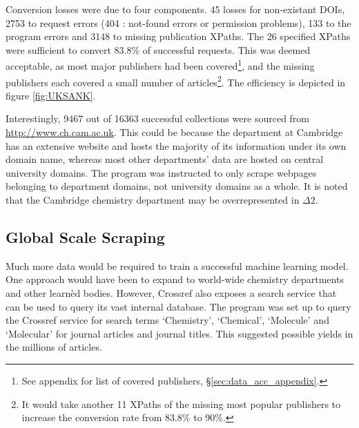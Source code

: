 Conversion losses were due to four components. 45 losses for non-existant DOIs, 2753 to request errors (404 : not-found errors or permission problems), 133 to the program errors and 3148 to missing publication XPaths. The 26 specified XPaths were sufficient to convert 83.8\% of successful requests. This was deemed acceptable, as most major publishers had been covered\footnote{See appendix for list of covered publishers, \S\ref{sec:data_acc_appendix}.}, and the missing publishers each covered a small number of articles\footnote{It would take another 11 XPaths of the missing most popular publishers to increase the conversion rate from 83.8\% to 90\%.}.
The efficiency is depicted in figure \ref{fig:UKSANK}.

Interestingly, 9467 out of 16363 successful collections were sourced from \url{http://www.ch.cam.ac.uk}. This could be because the department at Cambridge has an extensive website and  hosts the majority of its information under its own domain name, whereas most other departments' data are hosted on central university domains. The program was instructed to only scrape webpages belonging to department domains, not university domains as a whole. It is noted that the Cambridge chemistry department may be overrepresented in $\Delta2$.

\subsection{Global Scale Scraping}
\label{sec:CROSSREFSCRAPE}
Much more data would be required to train a successful machine learning model. One approach would have been to expand to world-wide chemistry departments and other learn\`{e}d bodies. However, Crossref also exposes a search service that can be used to query its vast internal database. The program was set up to query the Crossref service for search terms `Chemistry', `Chemical', `Molecule' and `Molecular' for journal articles and journal titles. This suggested possible yields in the millions of articles. 

